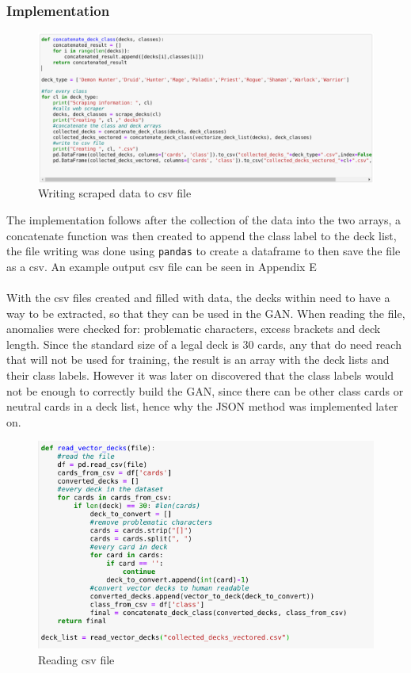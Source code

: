 \documentclass{report} %
\begin{document}
\subsubsection{Implementation}
\begin{figure}[H]
\centering
\includegraphics[width=1.25\textwidth]{csvIm}
\caption{Writing scraped data to csv file\protect}
 \label{board}
\end{figure}

The implementation follows after the collection of the data into the two arrays, a concatenate function was then created to append the class label to the deck list, the file writing was done using \nolinkurl{pandas} to create a dataframe to then save the file as a csv. An example output csv file can be seen in Appendix E \\ \\

With the csv files created and filled with data, the decks within need to have a way to be extracted, so that they can be used in the GAN. When reading the file, anomalies were checked for: problematic characters, excess brackets and deck length. Since the standard size of a legal deck is 30 cards, any that do need reach that will not be used for training, the result is an array with the deck lists and their class labels. However it was later on discovered that the class labels would not be enough to correctly build the GAN, since there can be other class cards or neutral cards in a deck list, hence why the JSON method was implemented later on. 


\begin{figure}[H]
\centering
\includegraphics[width=1.25\textwidth]{readVectorDecks}
\caption{Reading csv file\protect}
 \label{board}
\end{figure}
\end{document}
